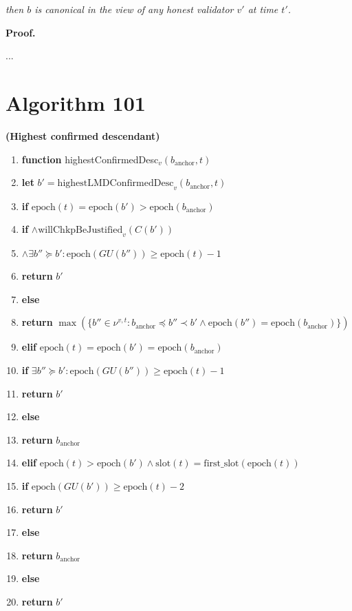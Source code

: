 \documentclass{article}
\begin{document}
\textit{then $b$ is canonical in the view of any honest validator $v'$ at time $t'$.}

\textbf{Proof.}

...

\section*{Algorithm 101}
\textbf{(Highest confirmed descendant)}

\begin{enumerate}
    \item \textbf{function} highestConfirmedDesc$_v(b_{\text{anchor}}, t)$
    \item \quad \textbf{let} $b' = \text{highestLMDConfirmedDesc}_v(b_{\text{anchor}}, t)$
    \item \quad \textbf{if} $\text{epoch}(t) = \text{epoch}(b') > \text{epoch}(b_{\text{anchor}})$
    \item \quad \quad \textbf{if} $\wedge \text{willChkpBeJustified}_v(C(b'))$
    \item \quad \quad \quad $\wedge \exists b'' \succeq b' : \text{epoch}(GU(b'')) \geq \text{epoch}(t) - 1$
    \item \quad \quad \quad \quad \textbf{return} $b'$
    \item \quad \quad \textbf{else}
    \item \quad \quad \quad \quad \textbf{return} $\max(\{b'' \in \nu^{v,t} : b_{\text{anchor}} \preceq b'' \prec b' \wedge \text{epoch}(b'') = \text{epoch}(b_{\text{anchor}})\})$
    \item \quad \textbf{elif} $\text{epoch}(t) = \text{epoch}(b') = \text{epoch}(b_{\text{anchor}})$
    \item \quad \quad \textbf{if} $\exists b'' \succeq b' : \text{epoch}(GU(b'')) \geq \text{epoch}(t) - 1$
    \item \quad \quad \quad \textbf{return} $b'$
    \item \quad \quad \textbf{else}
    \item \quad \quad \quad \textbf{return} $b_{\text{anchor}}$
    \item \quad \textbf{elif} $\text{epoch}(t) > \text{epoch}(b') \wedge \text{slot}(t) = \text{first\_slot}(\text{epoch}(t))$
    \item \quad \quad \textbf{if} $\text{epoch}(GU(b')) \geq \text{epoch}(t) - 2$
    \item \quad \quad \quad \textbf{return} $b'$
    \item \quad \quad \textbf{else}
    \item \quad \quad \quad \textbf{return} $b_{\text{anchor}}$
    \item \quad \textbf{else}
    \item \quad \quad \textbf{return} $b'$
\end{enumerate}
\end{document}

